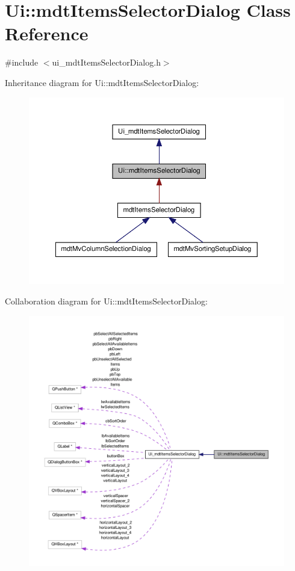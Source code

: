 \hypertarget{class_ui_1_1mdt_items_selector_dialog}{\section{Ui\-:\-:mdt\-Items\-Selector\-Dialog Class Reference}
\label{class_ui_1_1mdt_items_selector_dialog}
}


{\ttfamily \#include $<$ui\-\_\-mdt\-Items\-Selector\-Dialog.\-h$>$}



Inheritance diagram for Ui\-:\-:mdt\-Items\-Selector\-Dialog\-:\nopagebreak
\begin{figure}[H]
\begin{center}
\leavevmode
\includegraphics[width=350pt]{class_ui_1_1mdt_items_selector_dialog__inherit__graph}
\end{center}
\end{figure}


Collaboration diagram for Ui\-:\-:mdt\-Items\-Selector\-Dialog\-:\nopagebreak
\begin{figure}[H]
\begin{center}
\leavevmode
\includegraphics[width=350pt]{class_ui_1_1mdt_items_selector_dialog__coll__graph}
\end{center}
\end{figure}
